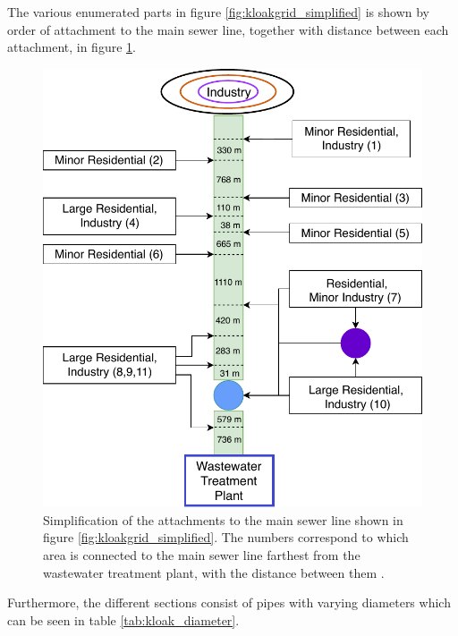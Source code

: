 \newpage

The various enumerated parts in figure \ref{fig:kloakgrid_simplified} is shown by order of attachment to the main sewer line, together with distance between each attachment, in figure \ref{fig:sewer_line_diagram}. 

\begin{figure}[H]
\centering
\includegraphics[width=0.6 \textwidth]{report/system_overview/pictures/sewer_line_diagram.pdf}
\caption{Simplification of the attachments to the main sewer line shown in figure \ref{fig:kloakgrid_simplified}. The numbers correspond to which area is connected to the main sewer line farthest from the wastewater treatment plant, with the distance between them \cite{GIS_kort}.}
\label{fig:sewer_line_diagram}
\end{figure}

Furthermore, the different sections consist of pipes with varying diameters which can be seen in table \ref{tab:kloak_diameter}.


